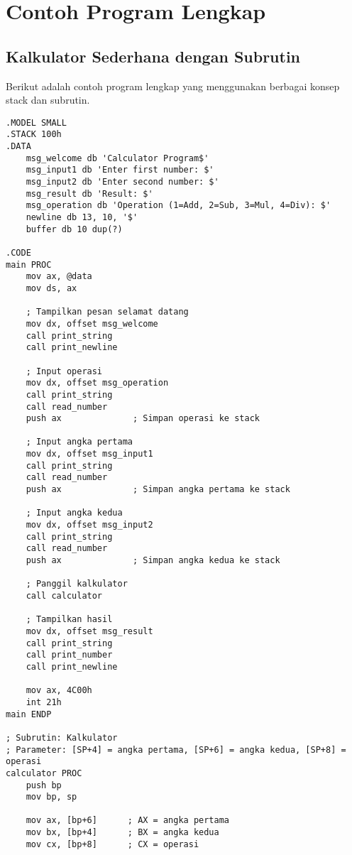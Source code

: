 \documentclass[../main.tex]{subfiles}
\begin{document}
    \section{Contoh Program Lengkap}
        \subsection{Kalkulator Sederhana dengan Subrutin}
            Berikut adalah contoh program lengkap yang menggunakan berbagai konsep stack dan subrutin.

            \begin{lstlisting}[language={[x86masm]Assembler}, caption=Program Kalkulator Lengkap, label={lst:calculator-complete}]
.MODEL SMALL
.STACK 100h
.DATA
    msg_welcome db 'Calculator Program$'
    msg_input1 db 'Enter first number: $'
    msg_input2 db 'Enter second number: $'
    msg_result db 'Result: $'
    msg_operation db 'Operation (1=Add, 2=Sub, 3=Mul, 4=Div): $'
    newline db 13, 10, '$'
    buffer db 10 dup(?)

.CODE
main PROC
    mov ax, @data
    mov ds, ax
    
    ; Tampilkan pesan selamat datang
    mov dx, offset msg_welcome
    call print_string
    call print_newline
    
    ; Input operasi
    mov dx, offset msg_operation
    call print_string
    call read_number
    push ax              ; Simpan operasi ke stack
    
    ; Input angka pertama
    mov dx, offset msg_input1
    call print_string
    call read_number
    push ax              ; Simpan angka pertama ke stack
    
    ; Input angka kedua
    mov dx, offset msg_input2
    call print_string
    call read_number
    push ax              ; Simpan angka kedua ke stack
    
    ; Panggil kalkulator
    call calculator
    
    ; Tampilkan hasil
    mov dx, offset msg_result
    call print_string
    call print_number
    call print_newline
    
    mov ax, 4C00h
    int 21h
main ENDP

; Subrutin: Kalkulator
; Parameter: [SP+4] = angka pertama, [SP+6] = angka kedua, [SP+8] = operasi
calculator PROC
    push bp
    mov bp, sp
    
    mov ax, [bp+6]      ; AX = angka pertama
    mov bx, [bp+4]      ; BX = angka kedua
    mov cx, [bp+8]      ; CX = operasi
    

\end{lstlisting}
\end{document}
